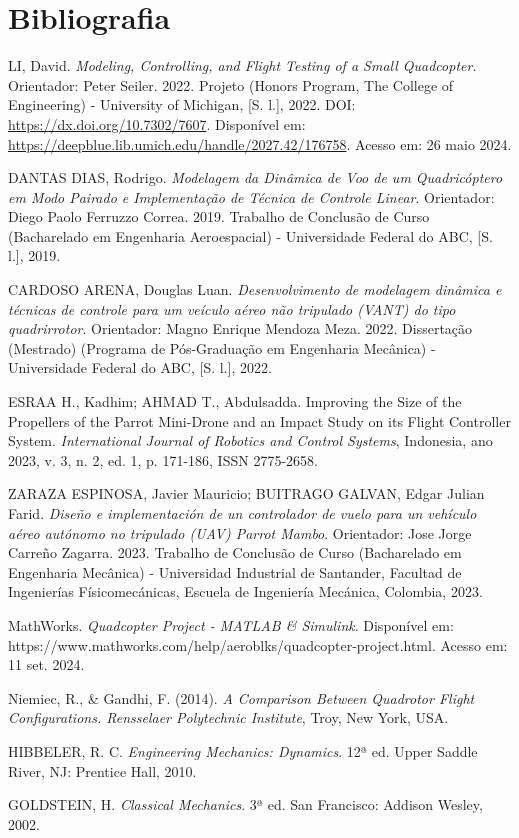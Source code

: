 \chapter{
    Bibliografia
}
\noindent LI, David. \textit{Modeling, Controlling, and Flight Testing of a Small Quadcopter}. Orientador: Peter Seiler. 2022. Projeto (Honors Program, The College of Engineering) - University of Michigan, [S. l.], 2022. DOI: \url{https://dx.doi.org/10.7302/7607}. Disponível em: \url{https://deepblue.lib.umich.edu/handle/2027.42/176758}. Acesso em: 26 maio 2024.

\noindent DANTAS DIAS, Rodrigo. \textit{Modelagem da Dinâmica de Voo de um Quadricóptero em Modo Pairado e Implementação de Técnica de Controle Linear}. Orientador: Diego Paolo Ferruzzo Correa. 2019. Trabalho de Conclusão de Curso (Bacharelado em Engenharia Aeroespacial) - Universidade Federal do ABC, [S. l.], 2019.

\noindent CARDOSO ARENA, Douglas Luan. \textit{Desenvolvimento de modelagem dinâmica e técnicas de controle para um veículo aéreo não tripulado (VANT) do tipo quadrirrotor}. Orientador: Magno Enrique Mendoza Meza. 2022. Dissertação (Mestrado) (Programa de Pós-Graduação em Engenharia Mecânica) - Universidade Federal do ABC, [S. l.], 2022.

\noindent ESRAA H., Kadhim; AHMAD T., Abdulsadda. Improving the Size of the Propellers of the Parrot Mini-Drone and an Impact Study on its Flight Controller System. \textit{International Journal of Robotics and Control Systems}, Indonesia, ano 2023, v. 3, n. 2, ed. 1, p. 171-186, ISSN 2775-2658.

\noindent ZARAZA ESPINOSA, Javier Mauricio; BUITRAGO GALVAN, Edgar Julian Farid. \textit{Diseño e implementación de un controlador de vuelo para un vehículo aéreo autónomo no tripulado (UAV) Parrot Mambo}. Orientador: Jose Jorge Carreño Zagarra. 2023. Trabalho de Conclusão de Curso (Bacharelado em Engenharia Mecânica) - Universidad Industrial de Santander, Facultad de Ingenierías Físicomecánicas, Escuela de Ingeniería Mecánica, Colombia, 2023.

\noindent MathWorks. \textit{Quadcopter Project - MATLAB & Simulink}. Disponível em: https://www.mathworks.com/help/aeroblks/quadcopter-project.html. Acesso em: 11 set. 2024.

\noindent Niemiec, R., & Gandhi, F. (2014). \textit{A Comparison Between Quadrotor Flight Configurations. Rensselaer Polytechnic Institute}, Troy, New York, USA.

\noindent HIBBELER, R. C. \textit{Engineering Mechanics: Dynamics}. 12ª ed. Upper Saddle River, NJ: Prentice Hall, 2010.

\noindent GOLDSTEIN, H. \textit{Classical Mechanics}. 3ª ed. San Francisco: Addison Wesley, 2002.
